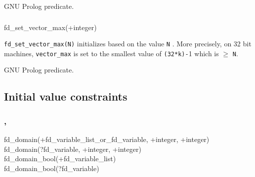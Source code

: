 \begin{PlErrors}


\end{PlErrors}

\Portability

GNU Prolog predicate.

\subsubsection{\label{fd-set-vector-max/1}}

\begin{TemplatesOneCol}
fd\_set\_vector\_max(+integer)

\end{TemplatesOneCol}

\Description

\texttt{fd\_set\_vector\_max(N)} initializes  based on
the value \texttt{N} . More precisely, on 32 bit
machines, \texttt{vector\_max} is set to the smallest value of
\texttt{(32*k)-}1 which is $\geq$ \texttt{N}.

\begin{PlErrors}




\end{PlErrors}

\Portability

GNU Prolog predicate.

\subsection{Initial value constraints}

\subsubsection{,
               }

\begin{TemplatesOneCol}
fd\_domain(+fd\_variable\_list\_or\_fd\_variable, +integer,
+integer)\\
fd\_domain(?fd\_variable, +integer, +integer)\\
fd\_domain\_bool(+fd\_variable\_list)\\
fd\_domain\_bool(?fd\_variable)

\end{TemplatesOneCol}


